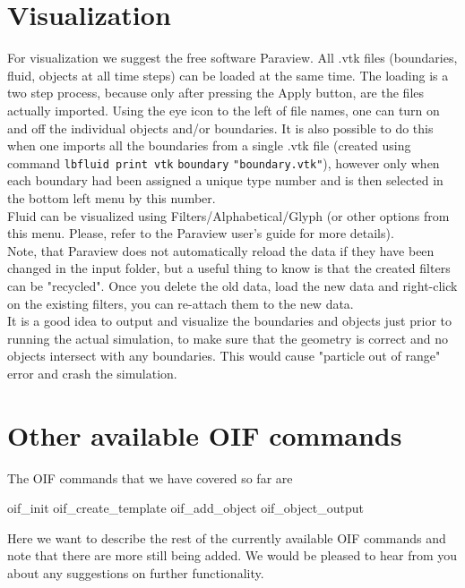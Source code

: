 \documentclass[
a4paper,                        %
11pt,                           %
twoside,                        %
footsepline,                    %
headsepline,                    %
headexclude,                    %
footexclude,                    %
pagesize,                       %
]{scrartcl}
\begin{document}
\section{Visualization}
For visualization we suggest the free software Paraview. All .vtk files (boundaries, fluid, objects at all time steps) can be loaded at the same time. The loading is a two step process, because only after pressing the Apply button, are the files actually imported. Using the eye icon to the left of file names, one can turn on and off the individual objects and/or boundaries. It is also possible to do this when one imports all the boundaries from a single .vtk file (created using command \verb|lbfluid print vtk| \verb|boundary| \verb|"boundary.vtk"|), however only when each boundary had been assigned a unique type number and is then selected in the bottom left menu by this number.\\ 

Fluid can be visualized using Filters/Alphabetical/Glyph (or other options from this menu. Please, refer to the Paraview user's guide for more details).\\

Note, that Paraview does not automatically reload the data if they have been changed in the input folder, but a useful thing to know is that the created filters can be "recycled". Once you delete the old data, load the new data and right-click on the existing filters, you can re-attach them to the new data.\\
  
It is a good idea to output and visualize the boundaries and objects just prior to running the actual simulation, to make sure that the geometry is correct and no objects intersect with any boundaries. This would cause "particle out of range" error and crash the simulation.\\ 

\section{Other available OIF commands}

The OIF commands that we have covered so far are\\
 \begin{tclcode}
oif_init
oif_create_template
oif_add_object
oif_object_output
 \end{tclcode}
 \vspace{0 mm}
 
Here we want to describe the rest of the currently available OIF commands and note that there are more still being added. We would be pleased to hear from you about any suggestions on further functionality.\\
\end{document}
